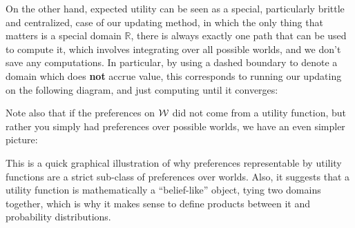 \documentclass{article}
\begin{document}
	On the other hand, expected utility can be seen as a special, particularly brittle and centralized, case of our updating method, in which the only thing that matters is a special domain $\mathbb R$, there is always exactly one path that can be used to compute it, which involves integrating over all possible worlds, and we don't save any computations. In particular, by using a dashed boundary to denote a domain which does \textbf{not} accrue value, this corresponds to running our updating on the following diagram, and just computing until it converges:\\
	
	\begin{center}
	\end{center}\vspace{1em}
	
	Note also that if the preferences on $\cal W$ did not come from a utility function, but rather you simply had preferences over possible worlds, we have an even simpler picture:
	
	\begin{center}
	\end{center}\vspace{1em}
	
	This is a quick graphical illustration of why preferences representable by utility functions are a strict sub-class of preferences over worlds. Also, it suggests that a utility function is mathematically a ``belief-like'' object, tying two domains together, which is why it makes sense to define products between it and probability distributions. 
	
\end{document}
